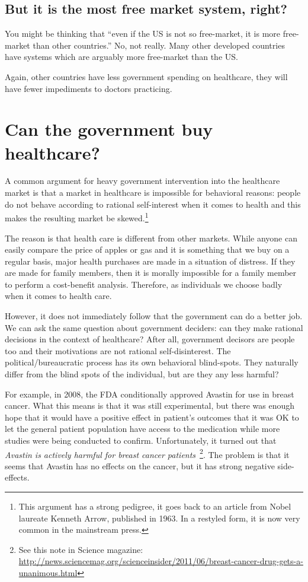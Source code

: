 \subsection{But it is the most free market system, right?}

You might be thinking that ``even if the US is not so free-market, it is more
free-market than other countries.'' No, not really. Many other developed
countries have systems which are arguably more free-market than the US.

Again, other countries have less government spending on healthcare, they will
have fewer impediments to doctors practicing.

\section{Can the government buy healthcare?}

A common argument for heavy government intervention into the healthcare market
is that a market in healthcare is impossible for behavioral reasons: people do
not behave according to rational self-interest when it comes to health and this
makes the resulting market be skewed.\footnote{This argument has a strong
pedigree, it goes back to an article from Nobel laureate Kenneth Arrow,
published in 1963. In a restyled form, it is now very common in the mainstream
press.}

The reason is that health care is different from other markets. While anyone
can easily compare the price of apples or gas and it is something that we buy
on a regular basis, major health purchases are made in a situation of distress.
If they are made for family members, then it is morally impossible for a family
member to perform a cost-benefit analysis. Therefore, as individuals we choose
badly when it comes to health care.

However, it does not immediately follow that the government can do a better
job. We can ask the same question about government deciders: can they make
rational decisions in the context of healthcare? After all, government decisors
are people too and their motivations are not rational self-disinterest. The
political/bureaucratic process has its own behavioral blind-spots. They
naturally differ from the blind spots of the individual, but are they any less
harmful?

For example, in 2008, the FDA conditionally approved Avastin for use in breast
cancer. What this means is that it was still experimental, but there was enough
hope that it would have a positive effect in patient's outcomes that it was OK
to let the general patient population have access to the medication while more
studies were being conducted to confirm. Unfortunately, it turned out that
\emph{Avastin is actively harmful for breast cancer
patients}~\cite{avastin-harfmul}\footnote{See this note in Science magazine:
\url{http://news.sciencemag.org/scienceinsider/2011/06/breast-cancer-drug-gets-a-unanimous.html}}.
The problem is that it seems that Avastin has no effects on the cancer, but it
has strong negative side-effects.

